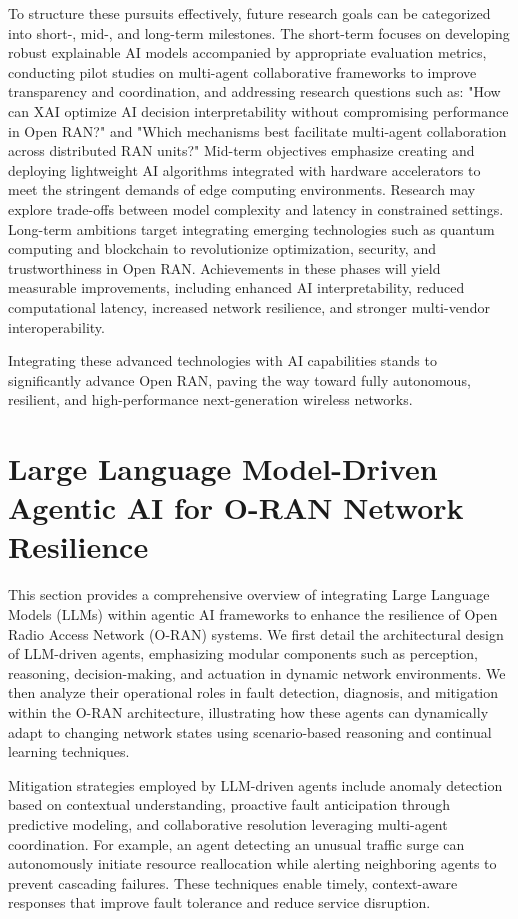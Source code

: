 \documentclass[sigconf]{acmart}
\begin{document}
To structure these pursuits effectively, future research goals can be categorized into short-, mid-, and long-term milestones. The short-term focuses on developing robust explainable AI models accompanied by appropriate evaluation metrics, conducting pilot studies on multi-agent collaborative frameworks to improve transparency and coordination, and addressing research questions such as: "How can XAI optimize AI decision interpretability without compromising performance in Open RAN?" and "Which mechanisms best facilitate multi-agent collaboration across distributed RAN units?" Mid-term objectives emphasize creating and deploying lightweight AI algorithms integrated with hardware accelerators to meet the stringent demands of edge computing environments. Research may explore trade-offs between model complexity and latency in constrained settings. Long-term ambitions target integrating emerging technologies such as quantum computing and blockchain to revolutionize optimization, security, and trustworthiness in Open RAN. Achievements in these phases will yield measurable improvements, including enhanced AI interpretability, reduced computational latency, increased network resilience, and stronger multi-vendor interoperability.

Integrating these advanced technologies with AI capabilities stands to significantly advance Open RAN, paving the way toward fully autonomous, resilient, and high-performance next-generation wireless networks.

\section{Large Language Model-Driven Agentic AI for O-RAN Network Resilience}

This section provides a comprehensive overview of integrating Large Language Models (LLMs) within agentic AI frameworks to enhance the resilience of Open Radio Access Network (O-RAN) systems. We first detail the architectural design of LLM-driven agents, emphasizing modular components such as perception, reasoning, decision-making, and actuation in dynamic network environments. We then analyze their operational roles in fault detection, diagnosis, and mitigation within the O-RAN architecture, illustrating how these agents can dynamically adapt to changing network states using scenario-based reasoning and continual learning techniques.

Mitigation strategies employed by LLM-driven agents include anomaly detection based on contextual understanding, proactive fault anticipation through predictive modeling, and collaborative resolution leveraging multi-agent coordination. For example, an agent detecting an unusual traffic surge can autonomously initiate resource reallocation while alerting neighboring agents to prevent cascading failures. These techniques enable timely, context-aware responses that improve fault tolerance and reduce service disruption.
\end{document}
